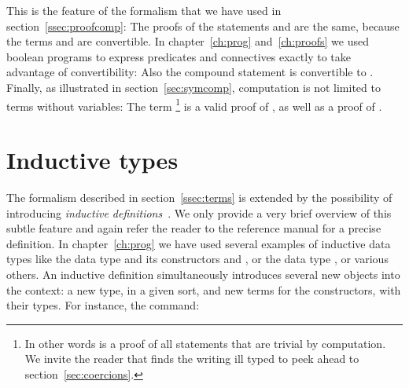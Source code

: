  This is the feature of the formalism that we
have used in section~\ref{ssec:proofcomp}: The proofs of the
statements  and  are the same, because the terms
 and  are convertible.  In chapter~\ref{ch:prog} and~\ref{ch:proofs}
we used boolean programs to express predicates and connectives exactly
to take advantage of convertibility: Also the compound
statement
 is convertible to .
Finally, as illustrated in
section~\ref{sec:symcomp}, computation is not limited to terms without
variables: The term \footnote{In other words  is a proof of all statements that are trivial by computation. We invite the reader that finds the writing  ill typed to peek ahead to section~\ref{sec:coercions}.} is a valid proof of
, as well as a proof of .


\section{Inductive types}\label{ssec:indtypes}

The formalism described in section~\ref{ssec:terms} is extended by
the possibility of introducing
\emph{inductive definitions}~\cite{CoPa89, Moh93}. We only provide a
very brief overview of this subtle feature and again refer the reader
to the reference manual for a precise definition.
In chapter~\ref{ch:prog} we have used several examples of inductive
data types like the data type  and its constructors  and
, or the data type , or various others.
An inductive definition simultaneously introduces
several new objects into the context: a new type, in a given sort, and
new terms for the constructors, with their types. For instance, the
command:

